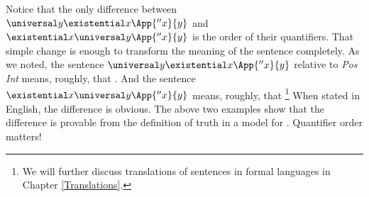 Notice that the only difference between $\universal\variable{y}\existential\variable{x}\App{''\variable{x}}{\variable{y}}$ and $\existential\variable{x}\universal\variable{y}\App{''\variable{x}}{\variable{y}}$ is the order of their quantifiers. 
That simple change is enough to transform the meaning of the sentence completely. 
As we noted, the sentence $\universal\variable{y}\existential\variable{x}\App{''\variable{x}}{\variable{y}}$ relative to \emph{Pos Int} means, roughly, that . 
And the sentence $\existential\variable{x}\universal\variable{y}\App{''\variable{x}}{\variable{y}}$ means, roughly, that \footnote{We will further discuss translations of sentences in formal languages in Chapter \ref{Translations}.}
When stated in English, the difference is obvious. 
The above two examples show that the difference is provable from the definition of truth in a model for \GQL{}.
Quantifier order matters!

